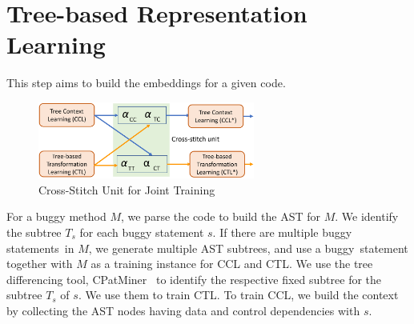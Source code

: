 \section{Tree-based Representation Learning}



This step aims to build the embeddings for a given code.

\begin{figure}[t]
	\centering
	\includegraphics[width=2.8in]{graphs/cross-stitch}
        \vspace{-6pt}
	\caption{Cross-Stitch Unit for Joint Training~\cite{misra2016cross}}
	\label{fig:cross-stitch}
\end{figure}



For a buggy method $M$, we parse the code to build the AST for
$M$. We identify the subtree $T_s$ for each buggy
statement $s$. If there are multiple buggy statements~in $M$, we
generate multiple AST subtrees, and use a buggy~statement
together with $M$ as a training instance for CCL and CTL.
We use the tree differencing tool, CPatMiner~\cite{nguyen2019graph} to
identify the respective fixed subtree for the subtree $T_s$ of $s$. We
use them to train CTL. To train CCL, we build the context by
collecting the AST nodes having data and control dependencies with
$s$.


